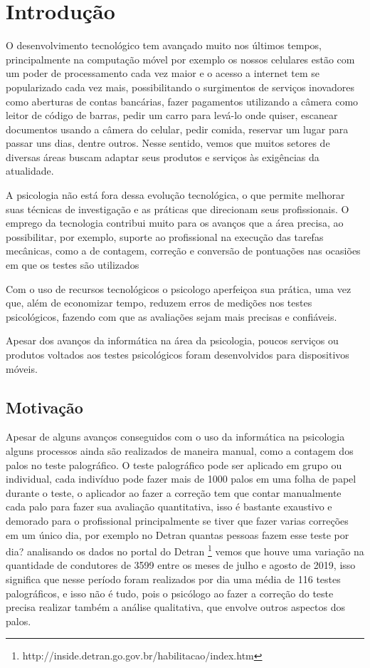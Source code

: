 \chapter{Introdução}
\label{cap:intro}


O desenvolvimento tecnológico tem avançado muito nos últimos tempos, principalmente na computação móvel por exemplo os nossos celulares  estão com um poder de processamento cada vez maior e o acesso a internet tem se popularizado cada vez mais, possibilitando o surgimentos de serviços inovadores como aberturas de contas bancárias, fazer pagamentos utilizando a câmera como leitor de código de barras, pedir um carro para levá-lo onde quiser, escanear documentos usando a câmera do celular, pedir comida, reservar um lugar para passar uns dias, dentre outros. Nesse sentido, vemos que muitos setores de diversas áreas buscam  adaptar seus produtos e serviços às exigências da atualidade.

A psicologia não está fora dessa evolução tecnológica, o que permite melhorar suas técnicas de investigação e as práticas que direcionam seus profissionais. O emprego da tecnologia contribui muito para os avanços que a área precisa, ao possibilitar, por exemplo, suporte ao profissional na execução das tarefas mecânicas, como a de contagem, correção e conversão de pontuações nas ocasiões em que os testes são utilizados \cite{psico-artigo}

Com o uso de recursos tecnológicos o psicologo aperfeiçoa sua prática, uma vez que, além de economizar tempo, reduzem erros de medições nos testes psicológicos, fazendo com que as avaliações sejam mais precisas e confiáveis.

Apesar dos avanços da informática na área da psicologia, poucos serviços ou produtos voltados aos testes psicológicos foram desenvolvidos para  dispositivos móveis.

\section{Motivação}
\label{sec:motiv}
Apesar de alguns avanços conseguidos com o uso da informática na psicologia alguns processos ainda são realizados de maneira manual, como a contagem dos palos no teste palográfico.
O teste palográfico pode ser aplicado em grupo ou individual, cada indivíduo pode fazer mais de 1000 palos em uma folha de papel durante o teste, o aplicador ao fazer a correção tem que contar manualmente cada palo para fazer sua avaliação quantitativa, isso é bastante exaustivo e demorado para o profissional principalmente se tiver que fazer varias correções em um único dia, por exemplo no Detran quantas pessoas fazem esse teste por dia? analisando os dados no portal do Detran \footnote{http://inside.detran.go.gov.br/habilitacao/index.htm} vemos que houve uma variação na quantidade de condutores de 3599 entre os meses de julho e agosto de 2019,  isso significa que nesse período foram realizados por dia uma média de 116 testes palográficos, e isso não é tudo, pois o psicólogo ao fazer a correção do teste  precisa realizar também a análise qualitativa, que envolve outros aspectos dos palos. 

